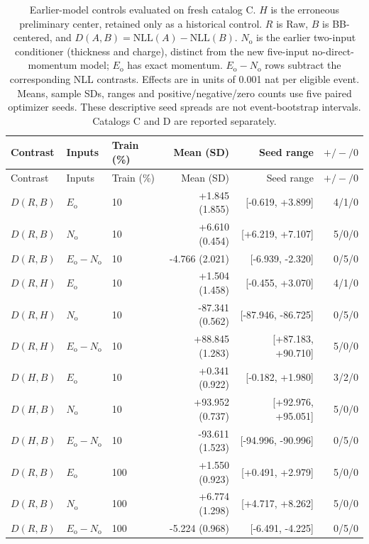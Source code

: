 \begingroup
\small
\setlength{\tabcolsep}{3pt}
\begin{longtable}{lllrrr}
\caption{Earlier-model controls evaluated on fresh catalog C. $H$ is the erroneous preliminary center, retained only as a historical control. $R$ is Raw, $B$ is BB-centered, and $D(A,B)=\mathrm{NLL}(A)-\mathrm{NLL}(B)$. $N_{\mathrm{o}}$ is the earlier two-input conditioner (thickness and charge), distinct from the new five-input no-direct-momentum model; $E_{\mathrm{o}}$ has exact momentum. $E_{\mathrm{o}}-N_{\mathrm{o}}$ rows subtract the corresponding NLL contrasts. Effects are in units of 0.001 nat per eligible event. Means, sample SDs, ranges and positive/negative/zero counts use five paired optimizer seeds. These descriptive seed spreads are not event-bootstrap intervals. Catalogs C and D are reported separately.}\label{tab:editorial-secondary-historical-C}\\
\toprule Contrast & Inputs & Train (\%) & Mean (SD) & Seed range & $+/-/0$\\ \midrule \endfirsthead
\toprule Contrast & Inputs & Train (\%) & Mean (SD) & Seed range & $+/-/0$\\ \midrule \endhead
$D(R,B)$ & $E_{\mathrm{o}}$ & 10 & +1.845 (1.855) & [-0.619, +3.899] & 4/1/0\\
$D(R,B)$ & $N_{\mathrm{o}}$ & 10 & +6.610 (0.454) & [+6.219, +7.107] & 5/0/0\\
$D(R,B)$ & $E_{\mathrm{o}}-N_{\mathrm{o}}$ & 10 & -4.766 (2.021) & [-6.939, -2.320] & 0/5/0\\
$D(R,H)$ & $E_{\mathrm{o}}$ & 10 & +1.504 (1.458) & [-0.455, +3.070] & 4/1/0\\
$D(R,H)$ & $N_{\mathrm{o}}$ & 10 & -87.341 (0.562) & [-87.946, -86.725] & 0/5/0\\
$D(R,H)$ & $E_{\mathrm{o}}-N_{\mathrm{o}}$ & 10 & +88.845 (1.283) & [+87.183, +90.710] & 5/0/0\\
$D(H,B)$ & $E_{\mathrm{o}}$ & 10 & +0.341 (0.922) & [-0.182, +1.980] & 3/2/0\\
$D(H,B)$ & $N_{\mathrm{o}}$ & 10 & +93.952 (0.737) & [+92.976, +95.051] & 5/0/0\\
$D(H,B)$ & $E_{\mathrm{o}}-N_{\mathrm{o}}$ & 10 & -93.611 (1.523) & [-94.996, -90.996] & 0/5/0\\
\midrule
$D(R,B)$ & $E_{\mathrm{o}}$ & 100 & +1.550 (0.923) & [+0.491, +2.979] & 5/0/0\\
$D(R,B)$ & $N_{\mathrm{o}}$ & 100 & +6.774 (1.298) & [+4.717, +8.262] & 5/0/0\\
$D(R,B)$ & $E_{\mathrm{o}}-N_{\mathrm{o}}$ & 100 & -5.224 (0.968) & [-6.491, -4.225] & 0/5/0\\

\end{longtable}
